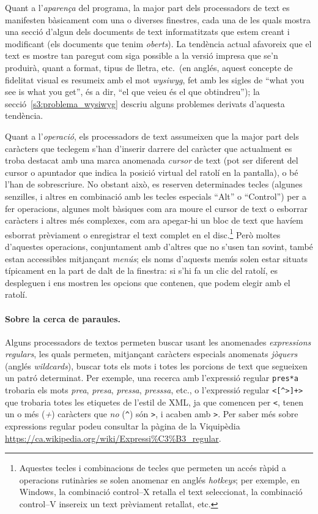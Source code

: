 Quant a l'\emph{aparença} del programa, la major part dels
processadors de text es manifesten bàsicament com una o diverses
finestres, cada una de les quals mostra una secció d'algun dels
documents de text informatitzats que estem creant i modificant (els
documents que tenim \emph{oberts}).  La tendència actual afavoreix que
el text es mostre tan paregut com siga possible a la versió impresa
que se'n produirà, quant a format, tipus de lletra, etc.\ (en anglés,
aquest concepte de fidelitat visual es resumeix amb el mot {\em
  wysiwyg}, fet amb les sigles de ``what you see is what you get'', és
a dir, ``el que veieu és el que obtindreu''); la
secció~\ref{s3:problema_wysiwyg} descriu alguns problemes derivats
d'aquesta tendència.

Quant a l'\emph{operació}, els processadors de text assumeixen que la
major part dels caràcters que teclegem s'han d'inserir darrere del
caràcter que actualment es troba destacat amb una marca anomenada {\em
  cursor} de text (pot ser diferent del cursor o apuntador que indica
la posició virtual del ratolí en la pantalla), o bé l'han de
sobrescriure. No obstant això, es reserven determinades tecles
(algunes senzilles, i altres en combinació amb les tecles especials
``Alt'' o ``Control'') per a fer operacions, algunes molt bàsiques com
ara moure el cursor de text o esborrar caràcters i altres més
complexes, com ara apegar-hi un bloc de text que havíem esborrat
prèviament o enregistrar el text complet en el disc.\footnote{Aquestes
  tecles i combinacions de tecles que permeten un accés ràpid a
  operacions rutinàries se solen anomenar en anglés \emph{hotkeys};
  per exemple, en Windows, la combinació control--X retalla el text
  seleccionat, la combinació control--V insereix un text prèviament
  retallat, etc.} Però moltes d'aquestes operacions, conjuntament amb
d'altres que no s'usen tan sovint, també estan accessibles mitjançant
\emph{menús}; els noms d'aquests menús solen estar situats típicament
en la part de dalt de la finestra: si s'hi fa un clic del ratolí, es
despleguen i ens mostren les opcions que contenen, que podem elegir
amb el ratolí.

\paragraph{Sobre la cerca de paraules.}
Alguns processadors de textos permeten buscar usant les anomenades
\emph{expressions regulars}, les quals permeten, mitjançant caràcters
especials anomenats \emph{jòquers} (anglés \emph{wildcards}), buscar
tots els mots i totes les porcions de text que segueixen un patró
determinat. Per exemple, una recerca amb l'expressió regular
\texttt{pres*a} trobaria els mots \emph{prea}, \emph{presa},
\emph{pressa}, \emph{presssa}, etc., o l'expressió regular
\texttt{<[\^{}>]+>} que trobaria totes les etiquetes de l'estil de
XML, ja que comencen per \texttt{<}, tenen un o més (\emph{+})
caràcters que \emph{no} (\texttt{\^}) són \texttt{>}, i acaben amb
\texttt{>}. Per saber més sobre expressions regular podeu consultar la
pàgina de la Viquipèdia
\url{https://ca.wikipedia.org/wiki/Expressi%C3%B3_regular}.

